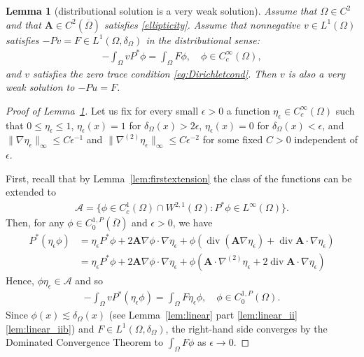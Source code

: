 \documentclass[12pt,a4paper]{amsart}
\newtheorem{lemma}[theorem]{\bf Lemma}
\theoremstyle{definition}
\newcommand{\A}{\mathbf{A}}
\newcommand*\Div{\operatorname{div}}
\begin{document}
\begin{lemma}[distributional solution is a very weak solution]\label{lem:veryweak}
    Assume that $\Omega \in C^{2}$ and that $\A\in C^{2}(\overline{\Omega})$ satisfies \eqref{ellipticity}. Assume that nonnegative $v\in L^1(\Omega)$ satisfies $-Pv = F\in L^1(\Omega,\delta_\Omega)$ in the distributional sense:
    \begin{align}\label{eq:weaklinear}
        -\int_\Omega v P^* \phi = \int_\Omega F\phi,\quad \phi \in C^\infty_c(\Omega),
    \end{align}
    and $v$ satisfies the zero trace condition \eqref{eq:Dirichletcond}. Then $v$ is also a very weak solution to $-Pu = F$.
\end{lemma}

\begin{proof}[Proof of Lemma~\ref{lem:veryweak}]
   Let us fix for every small $\epsilon>0$ a function $\eta_\epsilon\in C_c^\infty(\Omega)$ such that $0\leq\eta_\epsilon\leq 1$, $\eta_\epsilon(x) = 1$ for $\delta_\Omega(x)>2\epsilon$, $\eta_\epsilon(x)=0$ for $\delta_\Omega(x)<\epsilon$, and $\|\nabla \eta_\epsilon\|_\infty \leq C\epsilon^{-1}$ and $\|\nabla^{(2)}\eta_\epsilon\|_\infty \leq C\epsilon^{-2}$ for some fixed  $C>0$ independent of $\epsilon$.

 First, recall that by Lemma~\ref{lem:firstextension} the class of the functions can be extended to 
   \begin{align*}
       \mathcal{A} = \{\phi\in C^1_c(\Omega)\cap W^{2,1}(\Omega): P^*\phi\in L^\infty(\Omega)\}.
   \end{align*} Then, for any $\phi\in C^{1,P}_0(\overline{\Omega})$ and $\epsilon>0$, we have
    \begin{equation} \label{eq:P*cutoff}
    \begin{split}
        P^*(\eta_\epsilon \phi) &= \eta_\epsilon P^* \phi + 2\A \nabla \phi \cdot \nabla \eta_\epsilon + \phi(\Div (\A \nabla \eta_\epsilon) + \Div \A \cdot \nabla \eta_\epsilon) \\
        &= \eta_\epsilon P^* \phi + 2\A \nabla \phi \cdot \nabla \eta_\epsilon + \phi (\A \cdot \nabla^{(2)} \eta_\epsilon + 2 \Div \A \cdot \nabla \eta_\epsilon) 
    \end{split}
    \end{equation} 
    Hence, $\phi\eta_\epsilon\in\mathcal{A}$ and so 
    \begin{align*}
        -\int_\Omega v P^*(\eta_\epsilon \phi) = \int_\Omega F\eta_\epsilon \phi,\quad \phi  \in C_0^{1,P}(\Omega).
    \end{align*}
    Since $\phi(x)\lesssim \delta_\Omega(x)$ (see  Lemma~\ref{lem:linear} part \ref{lem:linear_ii} \ref{lem:linear_iib})  and $F \in L^1(\Omega,\delta_\Omega)$, the right-hand side converges by the Dominated Convergence Theorem to $\int_\Omega F\phi$ as $\epsilon\to 0$.
    

\end{proof}
\end{document}
